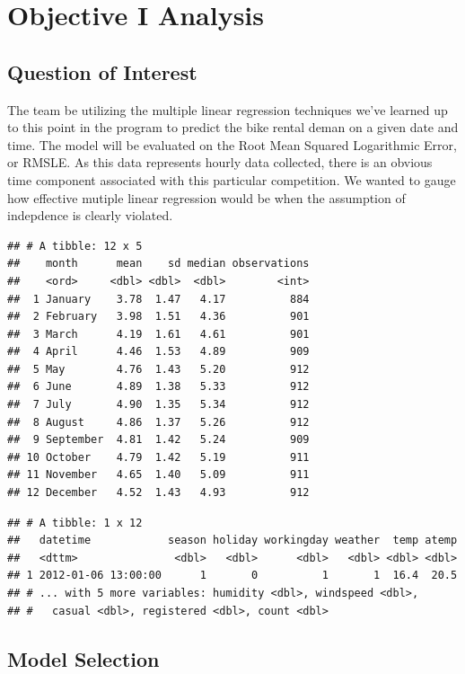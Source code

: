 \documentclass[american,]{article}
\begin{document}
\newpage

\hypertarget{objective-i-analysis}{%
\section{Objective I Analysis}\label{objective-i-analysis}}

\hypertarget{question-of-interest}{%
\subsection{Question of Interest}\label{question-of-interest}}

The team be utilizing the multiple linear regression techniques we've learned up to this point in the program to predict the bike rental deman on a given date and time. The model will be evaluated on the Root Mean Squared Logarithmic Error, or RMSLE. As this data represents hourly data collected, there is an obvious time component associated with this particular competition. We wanted to gauge how effective mutiple linear regression would be when the assumption of indepdence is clearly violated.

\begin{verbatim}
## # A tibble: 12 x 5
##    month      mean    sd median observations
##    <ord>     <dbl> <dbl>  <dbl>        <int>
##  1 January    3.78  1.47   4.17          884
##  2 February   3.98  1.51   4.36          901
##  3 March      4.19  1.61   4.61          901
##  4 April      4.46  1.53   4.89          909
##  5 May        4.76  1.43   5.20          912
##  6 June       4.89  1.38   5.33          912
##  7 July       4.90  1.35   5.34          912
##  8 August     4.86  1.37   5.26          912
##  9 September  4.81  1.42   5.24          909
## 10 October    4.79  1.42   5.19          911
## 11 November   4.65  1.40   5.09          911
## 12 December   4.52  1.43   4.93          912
\end{verbatim}

\begin{verbatim}
## # A tibble: 1 x 12
##   datetime            season holiday workingday weather  temp atemp
##   <dttm>               <dbl>   <dbl>      <dbl>   <dbl> <dbl> <dbl>
## 1 2012-01-06 13:00:00      1       0          1       1  16.4  20.5
## # ... with 5 more variables: humidity <dbl>, windspeed <dbl>,
## #   casual <dbl>, registered <dbl>, count <dbl>
\end{verbatim}

\hypertarget{model-selection}{%
\subsection{Model Selection}\label{model-selection}}
\end{document}
